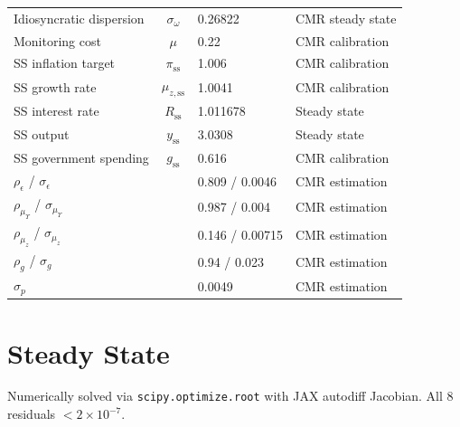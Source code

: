 \documentclass[11pt]{article}
\begin{document}
\begin{table}[h!]
\begin{tabular}{lcll}
Idiosyncratic dispersion & $\sigma_\omega$ & 0.26822 & CMR steady state \\
Monitoring cost & $\mu$ & 0.22 & CMR calibration \\[3pt]
SS inflation target & $\pi_{\text{ss}}$ & 1.006 & CMR calibration \\
SS growth rate & $\mu_{z,\text{ss}}$ & 1.0041 & CMR calibration \\
SS interest rate & $R_{\text{ss}}$ & 1.011678 & Steady state \\
SS output & $y_{\text{ss}}$ & 3.0308 & Steady state \\
SS government spending & $g_{\text{ss}}$ & 0.616 & CMR calibration \\[3pt]
$\rho_\epsilon$ / $\sigma_\epsilon$ & & 0.809 / 0.0046 & CMR estimation \\
$\rho_{\mu_\Upsilon}$ / $\sigma_{\mu_\Upsilon}$ & & 0.987 / 0.004 & CMR estimation \\
$\rho_{\mu_z}$ / $\sigma_{\mu_z}$ & & 0.146 / 0.00715 & CMR estimation \\
$\rho_g$ / $\sigma_g$ & & 0.94 / 0.023 & CMR estimation \\
$\sigma_p$ & & 0.0049 & CMR estimation \\
\bottomrule
\end{tabular}
\end{table}


\section{Steady State}
\label{sec:steady_state}

Numerically solved via \texttt{scipy.optimize.root} with JAX autodiff Jacobian.
All 8 residuals $< 2\times 10^{-7}$.
\end{document}
